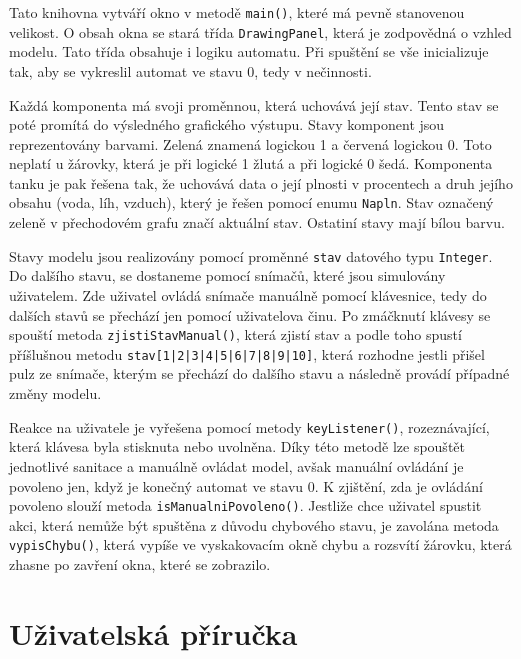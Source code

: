 \documentclass[12pt, a4paper]{article}
\begin{document}
\vspace{0.25cm}
Tato knihovna vytváří okno v metodě \texttt{main()}, které má pevně stanovenou velikost. O obsah okna se stará třída \texttt{DrawingPanel}, která je zodpovědná o vzhled modelu. Tato třída obsahuje i logiku automatu. Při spuštění se vše inicializuje tak, aby se vykreslil automat ve stavu 0, tedy v nečinnosti.

\vspace{0.25cm}
Každá komponenta má svoji proměnnou, která uchovává její stav. Tento stav se poté promítá do výsledného grafického výstupu. Stavy komponent jsou reprezentovány barvami. Zelená znamená logickou 1 a červená logickou 0. Toto neplatí u žárovky, která je při logické 1 žlutá a při logické 0 šedá. Komponenta tanku je pak řešena tak, že uchovává data o její plnosti v procentech a druh jejího obsahu (voda, líh, vzduch), který je řešen pomocí enumu \texttt{Napln}. Stav označený zeleně v přechodovém grafu značí aktuální stav. Ostatiní stavy mají bílou barvu.

\vspace{0.25cm}
Stavy modelu jsou realizovány pomocí proměnné \texttt{stav} datového typu \texttt{Integer}. Do dalšího stavu, se dostaneme pomocí snímačů, které jsou simulovány uživatelem. Zde uživatel ovládá snímače manuálně pomocí klávesnice, tedy do dalších stavů se přechází jen pomocí uživatelova činu. Po zmáčknutí klávesy se spouští metoda \texttt{zjistiStavManual()}, která zjistí stav a podle toho spustí příšlušnou metodu \texttt{stav[1|2|3|4|5|6|7|8|9|10]}, která rozhodne jestli přišel pulz ze snímače, kterým se přechází do dalšího stavu a následně provádí případné změny modelu.  

\vspace{0.25cm}
Reakce na uživatele je vyřešena pomocí metody \texttt{keyListener()}, rozeznávající, která klávesa byla stisknuta nebo uvolněna. Díky této metodě lze spouštět jednotlivé sanitace a manuálně ovládat model, avšak manuální ovládání je povoleno jen, když je konečný automat ve stavu 0. K zjištění, zda je ovládání povoleno slouží metoda \texttt{isManualniPovoleno()}. Jestliže chce uživatel spustit akci, která nemůže být spuštěna z důvodu chybového stavu, je zavolána metoda \texttt{vypisChybu()}, která vypíše ve vyskakovacím okně chybu a rozsvítí žárovku, která zhasne po zavření okna, které se zobrazilo.

\section{Uživatelská příručka}
\end{document}
